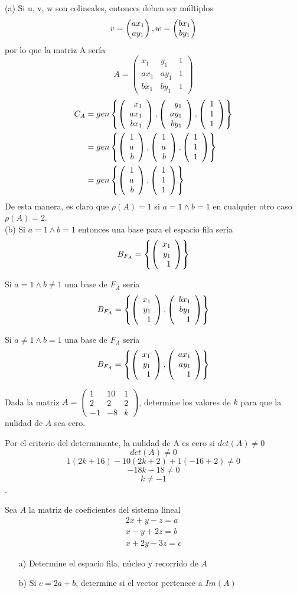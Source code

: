 \begin{enumerate}
\sol
(a) Si u, v, w son colineales, entonces deben ser m\'ultiplos
 $$v=\begin{pmatrix} a x_1\\ a y_1\\ \end{pmatrix} , w=\begin{pmatrix} b x_1\\ b y_1\\ \end{pmatrix} $$
por lo que la matriz A ser\'ia
\[A=
\left(
\begin{array}{rrr}
x_1&y_1&1\\
a x_1&a y_1&1\\
b x_1&b y_1&1
\end{array}
\right)
\]
\begin{eqnarray*}
C_A &=gen \left\{
\left( \begin{array}{r} x_1\\ ax_1\\ b x_1 \end{array} \right) , 
\left( \begin{array}{r} y_1\\ a y_1\\ b y_1 \end{array} \right) , 
\left( \begin{array}{r} 1\\ 1\\ 1 \end{array} \right) 
 \right\} \\&=
gen \left\{
\left( \begin{array}{r} 1\\ a\\ b \end{array} \right) , 
\left( \begin{array}{r} 1\\ a\\ b \end{array} \right) , 
\left( \begin{array}{r} 1\\ 1\\ 1 \end{array} \right) 
 \right\} \\&=
gen \left\{
\left( \begin{array}{r} 1\\ a\\ b \end{array} \right) , 
\left( \begin{array}{r} 1\\ 1\\ 1 \end{array} \right) 
 \right\} 
\end{eqnarray*}
De esta manera, es claro que $\rho(A)=1$ si $a=1 \wedge b=1$
en cualquier otro caso $\rho(A)=2$.
~\\
(b) Si $a=1 \wedge b=1$ entonces una base para el espacio fila ser\'ia $$B_{F_A}= \left\{
\left( \begin{array}{r} x_1\\  y_1\\  1 \end{array} \right) 
 \right\} $$

Si $a=1 \wedge b\neq 1$ una base de $F_A$ ser\'ia
\[B_{F_A}= \left\{
\left( \begin{array}{r} x_1\\  y_1\\  1 \end{array} \right) ,
\left( \begin{array}{r} b x_1\\ b y_1\\ 1 \end{array} \right) 
 \right\} \]

Si $a\neq 1 \wedge b=1$ una base de $F_A$ ser\'ia
\[B_{F_A}= \left\{
\left( \begin{array}{r} x_1\\  y_1\\  1 \end{array} \right) ,
\left( \begin{array}{r} a x_1\\ a y_1\\ 1 \end{array} \right) 
 \right\} \]
\newpage
\begin{prob}
Dada la matriz $A=
\left(
\begin{array}{rrr}
1&10&1\\
2&2&2\\
-1&-8&k
\end{array}
\right)
$, determine los valores de $k$ para que la nulidad de $A$ sea cero.
\end{prob}

\sol

Por el criterio del determinante, la nulidad de A es cero si $det(A)\neq 0$
\[det(A)\neq 0\]
\[1(2k+16)-10(2k+2)+1(-16+2)\neq 0\]
\[-18k-18\neq 0\]
\[k\neq -1\].

\newpage
\begin{prob}
Sea $A$ la matriz de coeficientes del sistema lineal
\begin{eqnarray*}
2x+y-z=a\\
x-y+2z=b\\
x+2y-3z=c
\end{eqnarray*}
\begin{enumerate}
\item[a)] Determine el espacio fila, n\'ucleo y recorrido de $A$
\item[b)] Si $c=2a+b$, determine si el vector  pertenece a $Im(A)$
\end{enumerate}
\end{prob}


\end{enumerate}
